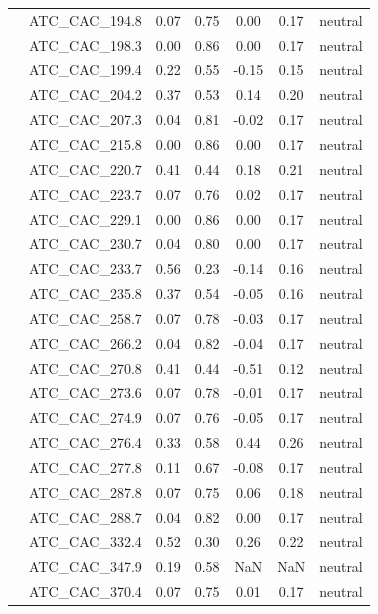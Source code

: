 \documentclass[11pt,]{article}
\begin{document}
\begin{longtable}[c]{@{}lcccccc@{}}
& ATC\_CAC\_194.8 & 0.07 & 0.75 & 0.00 & 0.17 & neutral
\\\addlinespace
& ATC\_CAC\_198.3 & 0.00 & 0.86 & 0.00 & 0.17 & neutral
\\\addlinespace
& ATC\_CAC\_199.4 & 0.22 & 0.55 & -0.15 & 0.15 & neutral
\\\addlinespace
& ATC\_CAC\_204.2 & 0.37 & 0.53 & 0.14 & 0.20 & neutral
\\\addlinespace
& ATC\_CAC\_207.3 & 0.04 & 0.81 & -0.02 & 0.17 & neutral
\\\addlinespace
& ATC\_CAC\_215.8 & 0.00 & 0.86 & 0.00 & 0.17 & neutral
\\\addlinespace
& ATC\_CAC\_220.7 & 0.41 & 0.44 & 0.18 & 0.21 & neutral
\\\addlinespace
& ATC\_CAC\_223.7 & 0.07 & 0.76 & 0.02 & 0.17 & neutral
\\\addlinespace
& ATC\_CAC\_229.1 & 0.00 & 0.86 & 0.00 & 0.17 & neutral
\\\addlinespace
& ATC\_CAC\_230.7 & 0.04 & 0.80 & 0.00 & 0.17 & neutral
\\\addlinespace
& ATC\_CAC\_233.7 & 0.56 & 0.23 & -0.14 & 0.16 & neutral
\\\addlinespace
& ATC\_CAC\_235.8 & 0.37 & 0.54 & -0.05 & 0.16 & neutral
\\\addlinespace
& ATC\_CAC\_258.7 & 0.07 & 0.78 & -0.03 & 0.17 & neutral
\\\addlinespace
& ATC\_CAC\_266.2 & 0.04 & 0.82 & -0.04 & 0.17 & neutral
\\\addlinespace
& ATC\_CAC\_270.8 & 0.41 & 0.44 & -0.51 & 0.12 & neutral
\\\addlinespace
& ATC\_CAC\_273.6 & 0.07 & 0.78 & -0.01 & 0.17 & neutral
\\\addlinespace
& ATC\_CAC\_274.9 & 0.07 & 0.76 & -0.05 & 0.17 & neutral
\\\addlinespace
& ATC\_CAC\_276.4 & 0.33 & 0.58 & 0.44 & 0.26 & neutral
\\\addlinespace
& ATC\_CAC\_277.8 & 0.11 & 0.67 & -0.08 & 0.17 & neutral
\\\addlinespace
& ATC\_CAC\_287.8 & 0.07 & 0.75 & 0.06 & 0.18 & neutral
\\\addlinespace
& ATC\_CAC\_288.7 & 0.04 & 0.82 & 0.00 & 0.17 & neutral
\\\addlinespace
& ATC\_CAC\_332.4 & 0.52 & 0.30 & 0.26 & 0.22 & neutral
\\\addlinespace
& ATC\_CAC\_347.9 & 0.19 & 0.58 & NaN & NaN & neutral
\\\addlinespace
& ATC\_CAC\_370.4 & 0.07 & 0.75 & 0.01 & 0.17 & neutral

\end{longtable}
\end{document}
